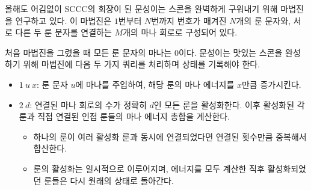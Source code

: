 올해도 어김없이 SCCC의 회장이 된 문성이는 스콘을 완벽하게 구워내기 위해 마법진을 연구하고 있다. 이 마법진은 $1$번부터 $N$번까지 번호가 매겨진 $N$개의 룬 문자와, 서로 다른 두 룬 문자를 연결하는 $M$개의 마나 회로로 구성되어 있다.

처음 마법진을 그렸을 때 모든 룬 문자의 마나는 $0$이다. 문성이는 맛있는 스콘을 완성하기 위해 마법진에 다음 두 가지 쿼리를 처리하며 상태를 기록해야 한다.

\begin{itemize}
    \item $1~u~x$: 룬 문자 $u$에 마나를 주입하여, 해당 룬의 마나 에너지를 $x$만큼 증가시킨다.
    \item $2~d$: 연결된 마나 회로의 수가 정확히 $d$인 모든 룬을 활성화한다. 이후 활성화된 각 룬과 직접 연결된 인접 룬들의 마나 에너지 총합을 계산한다.
    \begin{itemize}
        \item 하나의 룬이 여러 활성화 룬과 동시에 연결되었다면 연결된 횟수만큼 중복해서 합산한다.
        \item 룬의 활성화는 일시적으로 이루어지며, 에너지를 모두 계산한 직후 활성화되었던 룬들은 다시 원래의 상태로 돌아간다.
    \end{itemize}
\end{itemize}